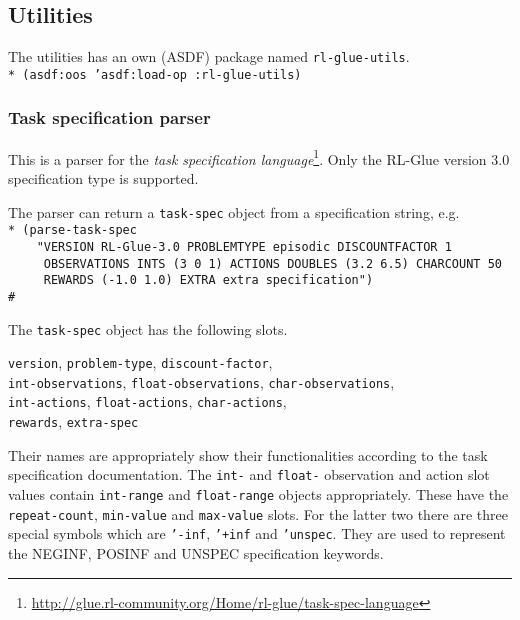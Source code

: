 \documentclass[11pt,a4paper,dvipdfm]{article}
\newcommand{\selfref}[1]{\href{#1}{#1}}
\newcommand{\footref}[2]{\textsl{#1}\footnote{\selfref{#2}}}
\newcommand{\prompttext}[1]{\texttt{#1}}
\newcommand{\lispprompt}[1]{\prompttext{* #1}}
\begin{document}
\hypertarget{rlutils}{\subsection{Utilities}}

The utilities has an own (ASDF) package named \prompttext{rl-glue-utils}. \\
\lispprompt{(asdf:oos 'asdf:load-op :rl-glue-utils)}

\subsubsection{Task specification parser}

This is a parser for the
\footref{task specification language}
{http://glue.rl-community.org/Home/rl-glue/task-spec-language}. Only the
RL-Glue version 3.0 specification type is supported.

The parser can return a \prompttext{task-spec} object from a specification
string, e.g. \\
\lispprompt{(parse-task-spec \\
\mbox{~~~~}"VERSION RL-Glue-3.0 PROBLEMTYPE episodic DISCOUNTFACTOR 1 \\
\mbox{~~~~~}OBSERVATIONS INTS (3 0 1) ACTIONS DOUBLES (3.2 6.5) CHARCOUNT 50 \\
\mbox{~~~~~}REWARDS (-1.0 1.0) EXTRA extra specification") \\
\#<TASK-SPEC>}

The \prompttext{task-spec} object has the following slots.

\prompttext{version}, \prompttext{problem-type}, \prompttext{discount-factor}, \\
\prompttext{int-observations}, \prompttext{float-observations},
\prompttext{char-observations}, \\ \prompttext{int-actions},
\prompttext{float-actions}, \prompttext{char-actions}, \\
\prompttext{rewards}, \prompttext{extra-spec}

Their names are appropriately show their functionalities according to the task
specification documentation. The \prompttext{int-} and \prompttext{float-}
observation and action slot values contain \prompttext{int-range} and
\prompttext{float-range} objects appropriately. These have the
\prompttext{repeat-count}, \prompttext{min-value} and \prompttext{max-value}
slots. For the latter two there are three special symbols which are
\prompttext{'-inf}, \prompttext{'+inf} and \prompttext{'unspec}. They are used
to represent the NEGINF, POSINF and UNSPEC specification keywords.
\end{document}
